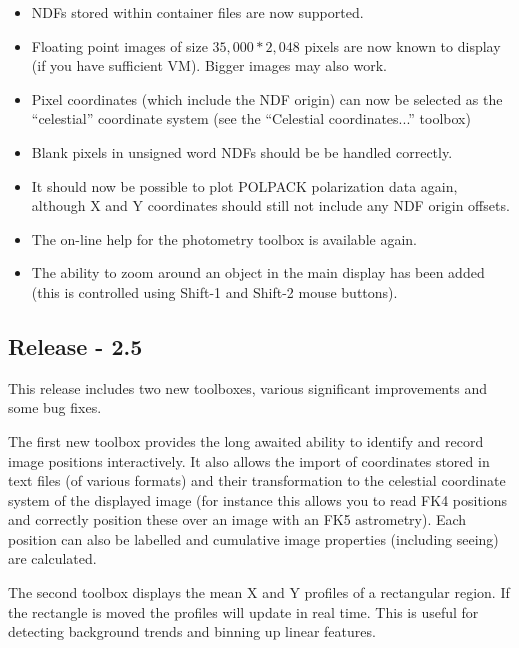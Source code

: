 \documentclass[twoside,11pt]{article}
\renewcommand{\_}{\texttt{\symbol{95}}}
\begin{document}
\begin{itemize}
\item NDFs stored within container files are now supported.

\item Floating point images of size $35,000*2,048$ pixels are now known to
      display (if you have sufficient VM). Bigger images may also work.

\item Pixel coordinates (which include the NDF origin) can now be
      selected as the ``celestial'' coordinate system (see the
      ``Celestial coordinates...'' toolbox)

\item Blank pixels in unsigned word NDFs should be be handled
      correctly.

\item It should now be possible to plot POLPACK polarization data
      again, although X and Y coordinates should still not include any
      NDF origin offsets.

\item The on-line help for the photometry toolbox is available
      again.

\item The ability to zoom around an object in the main display has
      been added (this is controlled using Shift-1 and Shift-2 mouse
      buttons).

\end{itemize}

\subsection{Release - 2.5}
  This release includes two new toolboxes, various significant
  improvements and some bug fixes.

  The first new toolbox provides the long awaited ability to identify
  and record image positions interactively. It also allows the import
  of coordinates stored in text files (of various formats) and their
  transformation to the celestial coordinate system of the displayed
  image (for instance this allows you to read FK4 positions and
  correctly position these over an image with an FK5 astrometry). Each
  position can also be labelled and cumulative image properties
  (including seeing) are calculated.

  The second toolbox displays the mean X and Y profiles of a
  rectangular region. If the rectangle is moved the profiles will
  update in real time. This is useful for detecting background trends
  and binning up linear features.
\end{document}
